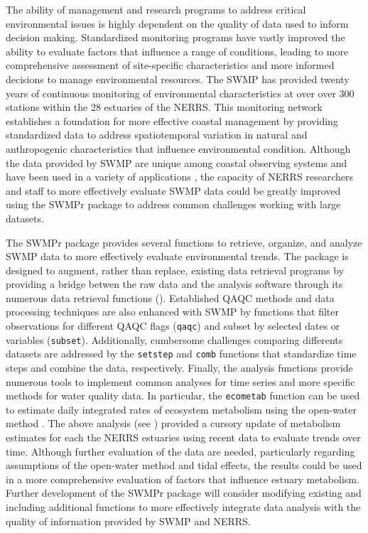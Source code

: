 \documentclass[10pt,letterpaper]{article}\usepackage[]{graphicx}\usepackage[]{color}
\begin{document}
The ability of management and research programs to address critical environmental issues is highly dependent on the quality of data used to inform decision making.  Standardized monitoring programs have vastly improved the ability to evaluate factors that influence a range of conditions, leading to more comprehensive assessment of site-specific characteristics and more informed decisions to manage environmental resources.  The \acl{SWMP} has provided twenty years of continuous monitoring of environmental characteristics at over over 300 stations within the 28 estuaries of the \acl{NERRS}.  This monitoring network establishes a foundation  for more effective coastal management by providing standardized data to address spatiotemporal variation in natural and anthropogenic characteristics that influence environmental condition.  Although the data provided by \ac{SWMP} are unique among coastal observing systems and have been used in a variety of applications \cite{Bulthius95,Caffrey03,Sanger02,Wenner04,Dix08}, the capacity of \ac{NERRS} researchers and staff to more effectively evaluate \ac{SWMP} data could be greatly improved using the SWMPr package to address common challenges working with large datasets.

The SWMPr package provides several functions to retrieve, organize, and analyze \ac{SWMP} data to more effectively evaluate environmental trends.  The package is designed to augment, rather than replace, existing data retrieval programs by providing a bridge betwen the raw data and the analysis software through its numerous data retrieval functions ().  Established \ac{QAQC} methods and data processing techniques are also enhanced with \ac{SWMP} by functions that filter observations for different \ac{QAQC} flags (\texttt{qaqc}) and subset by selected dates or variables (\texttt{subset}).  Additionally, cumbersome challenges comparing differents datasets are addressed by the \texttt{setstep} and \texttt{comb} functions that standardize time steps and combine the data, respectively.  Finally, the analysis functions provide numerous tools to implement common analyses for time series and more specific methods for water quality data.  In particular, the \texttt{ecometab} function can be used to estimate daily integrated rates of ecosystem metabolism using the open-water method \cite{Odum56,Caffrey14}.  The above analysis (see ) provided a cursory update of metabolism estimates for each the \ac{NERRS} estuaries using recent data to evaluate trends over time.  Although further evaluation of the data are needed, particularly regarding assumptions of the open-water method and tidal effects, the results could be used in a more comprehensive evaluation of factors that influence estuary metabolism. Further development of the SWMPr package will consider modifying existing and including additional functions to more effectively integrate data analysis with the quality of information provided by \ac{SWMP} and \ac{NERRS}. 
\end{document}
